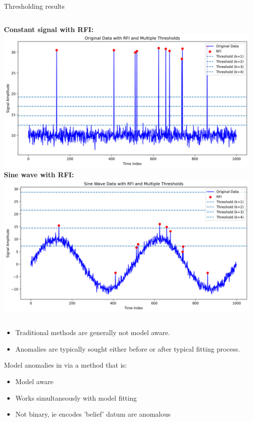 \documentclass[aspectratio=169]{beamer}
\begin{document}
\begin{frame}{Thresholding results}
  \begin{columns}
    \textbf{Constant signal with RFI:}
    \includegraphics[width=1\textwidth]{images/threshold_multiple.png}
    \textbf{Sine wave with RFI:}
    \includegraphics[width=1\textwidth]{images/threshold_sin_multiple.png}
  \end{columns}
  \begin{itemize}
    \item Traditional methods are generally not model aware.
    \item Anomalies are typically sought either before or after typical fitting process.
  \end{itemize}
\end{frame}

\begin{frame}{Model anomalies in via a method that is:}
  \begin{itemize}
    \item Model aware
    \item Works simultaneously with model fitting
    \item Not binary, ie encodes 'belief' datum are anomalous
  \end{itemize}
\end{frame}
\end{document}
